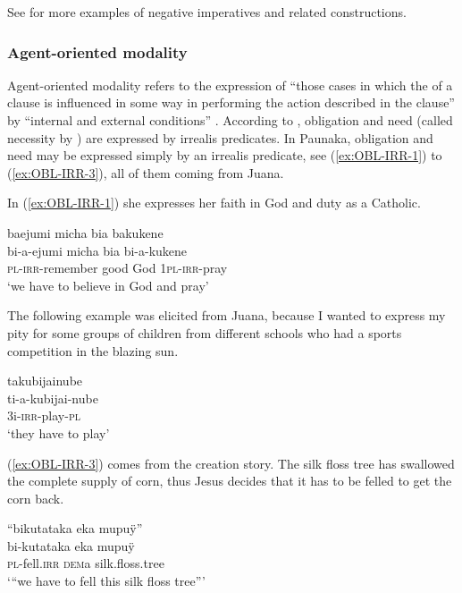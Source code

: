 See  for more examples of negative imperatives and related constructions.

\subsubsection{Agent-oriented modality}\label{sec:Agent-orientedModality}
Agent-oriented modality refers to the expression of “those cases in which the  of a clause is influenced in some way in performing the action described in the clause” \citep[30]{deHaan2005} by “internal and external conditions” \citep[177]{Bybee_et_al1994}. According to \citet[252]{Michael2014}, obligation and need (called necessity by \citealt[177]{Bybee_et_al1994}) are expressed by irrealis predicates. In Paunaka, obligation and need may be expressed simply by an irrealis predicate, see (\ref{ex:OBL-IRR-1}) to (\ref{ex:OBL-IRR-3}), all of them coming from Juana.

In (\ref{ex:OBL-IRR-1}) she expresses her faith in God and duty as a Catholic.

\ea\label{ex:OBL-IRR-1}
\begingl 
\glpreamble baejumi micha bia bakukene\\
\gla bi-a-ejumi micha bia bi-a-kukene\\ 
\textsc{pl}-\textsc{irr}-remember good God 1\textsc{pl}-\textsc{irr}-pray\\ 
\glft ‘we have to believe in God and pray’\\ 
\endgl
\xe


The following example was elicited from Juana, because I wanted to express my pity for some groups of children from different schools who had a sports competition in the blazing sun.

\ea\label{ex:OBL-IRR-4}
\begingl
\glpreamble takubijainube\\
\gla ti-a-kubijai-nube\\
\glb 3i-\textsc{irr}-play-\textsc{pl}\\
\glft ‘they have to play’
\endgl
 \trailingcitation{[jrx-e151019l-2]}
\xe

(\ref{ex:OBL-IRR-3}) comes from the creation story. The silk floss tree has swallowed the complete supply of corn, thus Jesus decides that it has to be felled to get the corn back.

\ea\label{ex:OBL-IRR-3}
\begingl
\glpreamble “bikutataka eka mupuÿ”\\
\gla bi-kutataka eka mupuÿ\\
\textsc{pl}-fell.\textsc{irr} \textsc{dem}a silk.floss.tree\\
\glft ‘“we have to fell this silk floss tree”’
\endgl
 \trailingcitation{[jxx-n101013s-1.793-794]}
\xe

